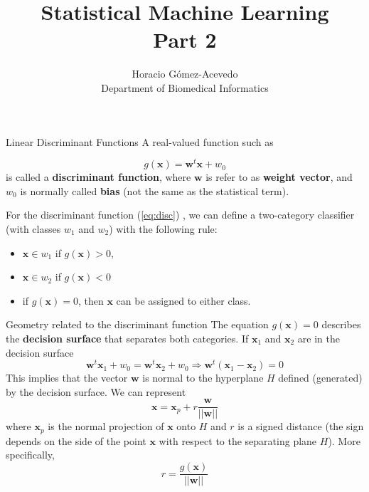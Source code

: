 \documentclass{beamer}
\title{Statistical Machine Learning\\ Part 2}
\author{Horacio G\'omez-Acevedo\\ Department of Biomedical Informatics}
\begin{document}
	\begin{frame}[plain]
		\maketitle
	\end{frame}
	\begin{frame}{Linear Discriminant Functions}
		A real-valued  function such as 
	
		\begin{equation}
			g(\mathbf{x})=\mathbf{w}^t \mathbf{x} +w_0	
			\label{eq:disc}
	\end{equation}	
	is called a {\bf discriminant function},
	where $\mathbf{w}$ is refer to as {\bf weight vector}, and  $w_0$  is normally called {\bf bias} (not the same as the statistical term). 
	
	For the discriminant function (\ref{eq:disc}) , we can define a two-category classifier (with classes $w_1$ and $w_2$) with the following rule:
	\begin{itemize}
		\item $\mathbf{x}\in w_1$ if $g(\mathbf{x}) >0$,
		\item $\mathbf{x}\in w_2$ if $g(\mathbf{x}) <0$
		\item if $g(\mathbf{x})=0$, then $\mathbf{x}$ can be assigned to either class.
	\end{itemize}
\end{frame}

\begin{frame}{Geometry related to the discriminant function}
	The equation $g(\mathbf{x})=0$ describes the {\bf decision surface} that separates both categories. If $\mathbf{x}_1$ and $\mathbf{x}_2$ are in the decision surface
	\begin{equation*}
		\mathbf{w}^t \mathbf{x}_1+w_0= \mathbf{w}^t \mathbf{x}_2+ w_0 \Rightarrow \mathbf{w}^t (\mathbf{x}_1 - \mathbf{x}_2)=0
	\end{equation*}
This implies that the vector $\mathbf{w}$ is normal to the hyperplane $H$ defined (generated) by the decision surface.
We can represent 
\begin{equation*}
	\mathbf{x}= \mathbf{x}_p+ r \frac{\mathbf{w}}{||\mathbf{w}||}
\end{equation*}
where $\mathbf{x}_p$ is the normal projection of $\mathbf{x}$ onto $H$ and $r$ is a signed distance (the sign depends on the side of the point $\mathbf{x}$ with respect to the separating plane $H$). More specifically,
\begin{equation*}
	r= \frac{g(\mathbf{x})}{||\mathbf{w}||}
\end{equation*}
\end{frame}
\end{document}
